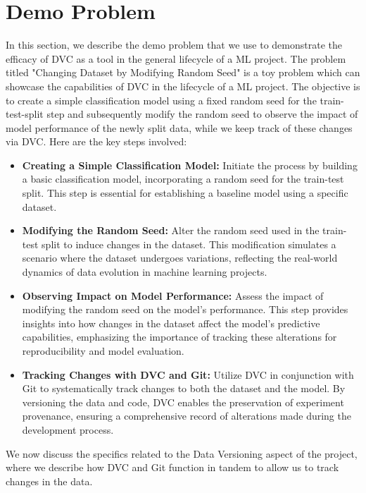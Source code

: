 \documentclass[12pt]{article}
\begin{document}
\newpage

\section{Demo Problem}

In this section, we describe the demo problem that we use to demonstrate the efficacy of DVC as a tool in the general lifecycle of a ML project. The problem titled "Changing Dataset by Modifying Random Seed" is a toy problem which can showcase the capabilities of DVC in the lifecycle of a ML project. The objective is to create a simple classification model using a fixed random seed for the train-test-split step and subsequently modify the random seed to observe the impact of model performance of the newly split data, while we keep track of these changes via DVC. Here are the key steps involved:

\begin{itemize}
    \item \textbf{Creating a Simple Classification Model:} Initiate the process by building a basic classification model, incorporating a random seed for the train-test split. This step is essential for establishing a baseline model using a specific dataset.
    \item \textbf{Modifying the Random Seed:} Alter the random seed used in the train-test split to induce changes in the dataset. This modification simulates a scenario where the dataset undergoes variations, reflecting the real-world dynamics of data evolution in machine learning projects.
    \item \textbf{Observing Impact on Model Performance:} Assess the impact of modifying the random seed on the model's performance. This step provides insights into how changes in the dataset affect the model's predictive capabilities, emphasizing the importance of tracking these alterations for reproducibility and model evaluation.
    \item \textbf{Tracking Changes with DVC and Git:} Utilize DVC in conjunction with Git to systematically track changes to both the dataset and the model. By versioning the data and code, DVC enables the preservation of experiment provenance, ensuring a comprehensive record of alterations made during the development process.
\end{itemize}

We now discuss the specifics related to the Data Versioning aspect of the project, where we describe how DVC and Git function in tandem to allow us to track changes in the data.
\end{document}
